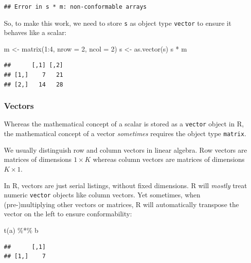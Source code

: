 \documentclass[
  11pt,
]{article}
\newenvironment{Shaded}{\begin{snugshade}}{\end{snugshade}}
\newcommand{\AttributeTok}[1]{\textcolor[rgb]{0.77,0.63,0.00}{#1}}
\newcommand{\DecValTok}[1]{\textcolor[rgb]{0.00,0.00,0.81}{#1}}
\newcommand{\FunctionTok}[1]{\textcolor[rgb]{0.00,0.00,0.00}{#1}}
\newcommand{\NormalTok}[1]{#1}
\newcommand{\OtherTok}[1]{\textcolor[rgb]{0.56,0.35,0.01}{#1}}
\newcommand{\SpecialCharTok}[1]{\textcolor[rgb]{0.00,0.00,0.00}{#1}}
\begin{document}
\begin{verbatim}
## Error in s * m: non-conformable arrays
\end{verbatim}

So, to make this work, we need to store \texttt{s} as object type \texttt{vector} to ensure it behaves like a scalar:

\begin{Shaded}
\begin{Highlighting}[]
\NormalTok{m }\OtherTok{\textless{}{-}} \FunctionTok{matrix}\NormalTok{(}\DecValTok{1}\SpecialCharTok{:}\DecValTok{4}\NormalTok{, }\AttributeTok{nrow =} \DecValTok{2}\NormalTok{, }\AttributeTok{ncol =} \DecValTok{2}\NormalTok{)}
\NormalTok{s }\OtherTok{\textless{}{-}} \FunctionTok{as.vector}\NormalTok{(s)}
\NormalTok{s }\SpecialCharTok{*}\NormalTok{ m}
\end{Highlighting}
\end{Shaded}

\begin{verbatim}
##      [,1] [,2]
## [1,]    7   21
## [2,]   14   28
\end{verbatim}

\hypertarget{vectors-1}{%
\subsubsection{Vectors}\label{vectors-1}}

Whereas the mathematical concept of a scalar is stored as a \texttt{vector} object in R, the mathematical concept of a vector \emph{sometimes} requires the object type \texttt{matrix}.

We usually distinguish row and column vectors in linear algebra. Row vectors are matrices of dimensions \(1 \times K\) whereas column vectors are matrices of dimensions \(K \times 1\).

In R, vectors are just serial listings, without fixed dimensions. R will \emph{mostly}
treat numeric \texttt{vector} objects like column vectors. Yet sometimes, when (pre-)multiplying other vectors or matrices, R will automatically transpose the vector on the left to ensure conformability:

\begin{Shaded}
\begin{Highlighting}[]
\FunctionTok{t}\NormalTok{(a) }\SpecialCharTok{\%*\%}\NormalTok{ b}
\end{Highlighting}
\end{Shaded}

\begin{verbatim}
##      [,1]
## [1,]    7
\end{verbatim}
\end{document}
